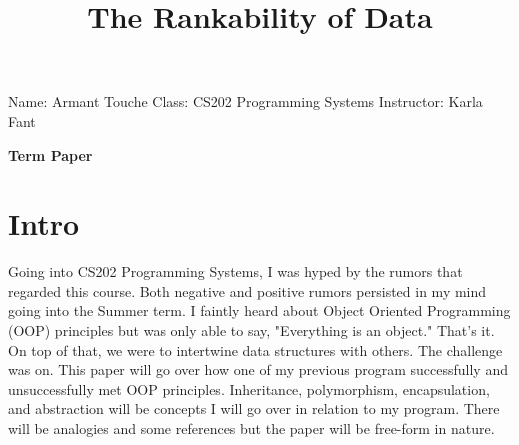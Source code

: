 \documentclass[a4paper,man,biblatex]{apa6}
\title{The Rankability of Data}
\begin{document}

\pagestyle{empty}
\noindent Name: Armant Touche\newline
\noindent Class: CS202 Programming Systems\newline
\noindent Instructor: Karla Fant

\begin{center}
    {\large{\bf Term Paper}}\\
\end{center}

\section*{Intro}
Going into CS202 Programming Systems, I was hyped by the rumors that regarded this course. Both negative and positive rumors persisted in my mind going into the Summer term. I faintly heard about Object Oriented Programming (OOP) principles but was only able to say, "Everything is an object." That's it. On top of that, we were to intertwine data structures with others. The challenge was on. This paper will go over how one of my previous program successfully and unsuccessfully met OOP principles. Inheritance, polymorphism, encapsulation, and abstraction will be concepts I will go over in relation to my program. There will be analogies and some references but the paper will be free-form in nature.
\end{document}
